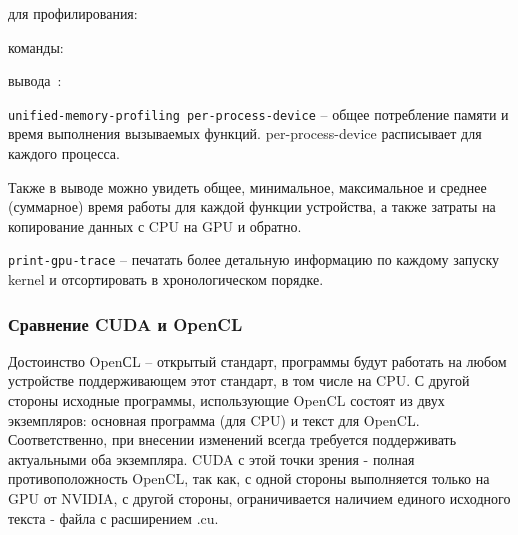  для профилирования:

 команды:

 вывода~\cite{Rutsh2011}: \\
\noindent{}

\texttt{{\textendash\textendash}unified-memory-profiling per-process-device} -- общее потребление памяти и время выполнения вызываемых функций. per-process-device расписывает для каждого процесса.

Также в выводе можно увидеть общее, минимальное, максимальное и среднее (суммарное) время работы для каждой функции устройства, а также затраты на копирование данных с CPU на GPU и обратно.

\texttt{{\textendash\textendash}print-gpu-trace} -- печатать более детальную информацию по каждому запуску kernel и отсортировать в хронологическом порядке.

\subsubsection*{Сравнение CUDA и OpenCL}
Достоинство OpenСL -- открытый стандарт, программы будут работать на любом устройстве поддерживающем этот стандарт, в том числе на CPU. С другой стороны исходные программы, использующие OpenCL состоят из двух экземпляров: основная программа (для CPU) и текст для OpenCL. Соответственно, при внесении изменений всегда требуется поддерживать актуальными оба экземпляра. CUDA с этой точки зрения - полная противоположность OpenCL, так как, с одной стороны выполняется только на GPU от NVIDIA, с другой стороны, ограничивается наличием единого исходного текста - файла с расширением .cu.

